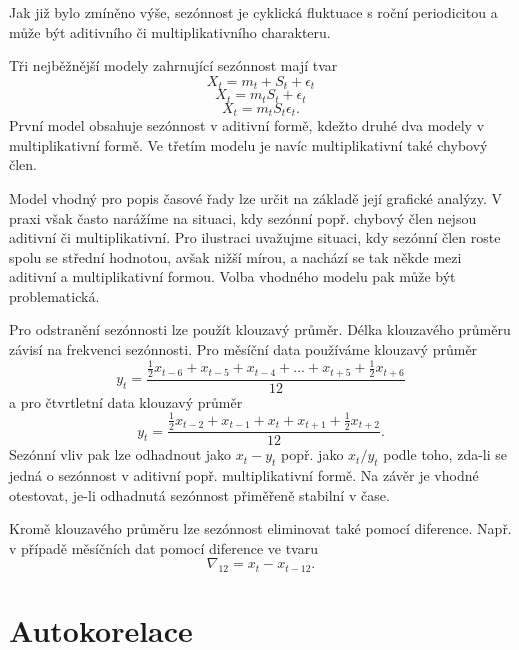 Jak již bylo zmíněno výše, sezónnost je cyklická fluktuace s roční periodicitou a může být aditivního či multiplikativního charakteru.

Tři nejběžnější modely zahrnující sezónnost mají tvar
\begin{equation}
X_t = m_t + S_t + \epsilon_t
\end{equation}
\begin{equation}
X_t = m_t S_t + \epsilon_t
\end{equation}
\begin{equation}
X_t = m_t S_t \epsilon_t.
\end{equation}
První model obsahuje sezónnost v aditivní formě, kdežto druhé dva modely v multiplikativní formě. Ve třetím modelu je navíc multiplikativní také chybový člen.

Model vhodný pro popis časové řady lze určit na základě její grafické analýzy. V praxi však často narážíme na situaci, kdy sezónní popř. chybový člen nejsou aditivní či multiplikativní. Pro ilustraci uvažujme situaci, kdy sezónní člen roste spolu se střední hodnotou, avšak nižší mírou, a nachází se tak někde mezi aditivní a multiplikativní formou. Volba vhodného modelu pak může být problematická.

Pro odstranění sezónnosti lze použít klouzavý průměr. Délka klouzavého průměru závisí na frekvenci sezónnosti. Pro měsíční data používáme klouzavý průměr
\begin{equation}
y_t = \frac{\frac{1}{2} x_{t - 6} + x_{t - 5} + x_{t - 4} + ... + x_{t + 5} + \frac{1}{2}x_{t + 6}}{12}
\end{equation}
a pro čtvrtletní data klouzavý průměr
\begin{equation}
y_t = \frac{\frac{1}{2} x_{t - 2} + x_{t - 1} + x_t + x_{t + 1} + \frac{1}{2}x_{t + 2}}{12}.
\end{equation}
Sezónní vliv pak lze odhadnout jako $x_t - y_t$ popř. jako $x_t / y_t$ podle toho, zda-li se jedná o sezónnost v aditivní popř. multiplikativní formě. Na závěr je vhodné otestovat, je-li odhadnutá sezónnost přiměřeně stabilní v čase.

Kromě klouzavého průměru lze sezónnost eliminovat také pomocí diference. Např. v případě měsíčních dat pomocí diference ve tvaru
\begin{equation}
\nabla_{12} = x_t - x_{t-12}.
\end{equation}

\section{Autokorelace}

